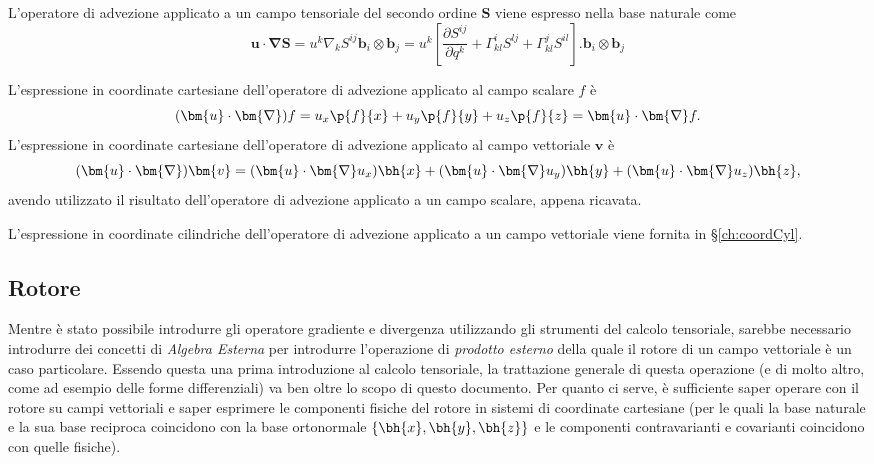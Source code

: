  L'operatore di advezione applicato a un campo tensoriale del secondo ordine $\bm{S}$ viene espresso nella base naturale come
 \begin{equation}
  \bm{u} \cdot \bm{\nabla}\bm{S}  =  u^k \nabla_k S^{ij}   \bm{b}_i \otimes \bm{b}_j
    =  u^k \left[  \dfrac{\partial S^{ij}}{\partial q^k} + \Gamma_{kl}^i S^{lj} + \Gamma_{kl}^j S^{il} \right] .
     \bm{b}_i \otimes \bm{b}_j 
 \end{equation}
%
\begin{example}
 L'espressione in coordinate cartesiane dell'operatore di advezione applicato al campo scalare $f$ è
 \begin{equation}
  (\bm{u} \cdot \bm{\nabla}) f = u_x \p{f}{x} + u_y \p{f}{y} + u_z \p{f}{z} = \bm{u} \cdot \bm{\nabla}f .
 \end{equation}
  L'espressione in coordinate cartesiane dell'operatore di advezione applicato al campo vettoriale $\bm{v}$ è
 \begin{equation}
  (\bm{u} \cdot \bm{\nabla}) \bm{v} = (\bm{u} \cdot \bm{\nabla} u_x) \bh{x} + (\bm{u} \cdot \bm{\nabla}u_y) \bh{y} + (\bm{u} \cdot \bm{\nabla}u_z) \bh{z} ,
 \end{equation}
 avendo utilizzato il risultato dell'operatore di advezione applicato a un campo scalare, appena ricavata.
\end{example}
\begin{example}
 L'espressione in coordinate cilindriche dell'operatore di advezione applicato a un campo vettoriale viene fornita in \S\ref{ch:coordCyl}.
\end{example}

\subsection{Rotore}
 Mentre è stato possibile introdurre gli operatore gradiente e divergenza utilizzando gli strumenti del calcolo tensoriale, sarebbe necessario introdurre dei concetti di \textit{Algebra Esterna} per introdurre l'operazione di \textit{prodotto esterno} della quale il rotore di un campo vettoriale è un caso particolare. Essendo questa una prima introduzione al calcolo tensoriale, la trattazione generale di questa operazione (e di molto altro, come ad esempio delle forme differenziali) va ben oltre lo scopo di questo documento.
 Per quanto ci serve, è sufficiente saper operare con il rotore su campi vettoriali e saper esprimere le componenti fisiche del rotore in sistemi di coordinate cartesiane (per le quali la base naturale e la sua base reciproca coincidono con la base ortonormale $\{\bh{x},\bh{y},\bh{z}\}$ e le componenti contravarianti e covarianti coincidono con quelle fisiche).

